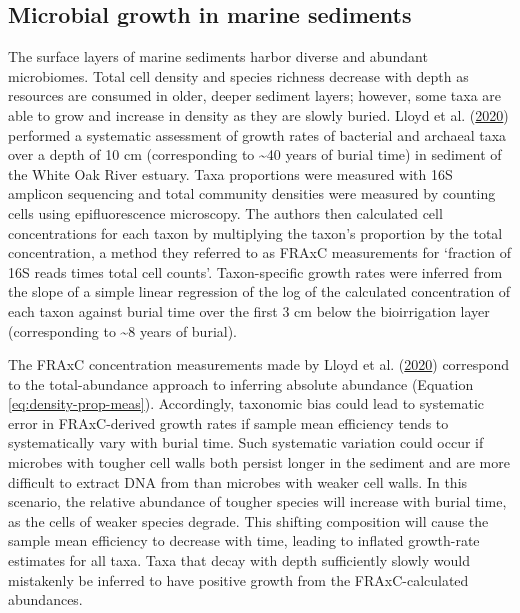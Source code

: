 \documentclass[
]{article}
\begin{document}
\hypertarget{microbial-growth-in-marine-sediments}{%
\subsection{Microbial growth in marine sediments}\label{microbial-growth-in-marine-sediments}}

The surface layers of marine sediments harbor diverse and abundant microbiomes.
Total cell density and species richness decrease with depth as resources are consumed in older, deeper sediment layers; however, some taxa are able to grow and increase in density as they are slowly buried.
Lloyd et al. (\protect\hyperlink{ref-lloyd2020evid}{2020}) performed a systematic assessment of growth rates of bacterial and archaeal taxa over a depth of 10 cm (corresponding to \textasciitilde40 years of burial time) in sediment of the White Oak River estuary.
Taxa proportions were measured with 16S amplicon sequencing and total community densities were measured by counting cells using epifluorescence microscopy.
The authors then calculated cell concentrations for each taxon by multiplying the taxon's proportion by the total concentration, a method they referred to as FRAxC measurements for `fraction of 16S reads times total cell counts'.
Taxon-specific growth rates were inferred from the slope of a simple linear regression of the log of the calculated concentration of each taxon against burial time over the first 3 cm below the bioirrigation layer (corresponding to \textasciitilde8 years of burial).

The FRAxC concentration measurements made by Lloyd et al. (\protect\hyperlink{ref-lloyd2020evid}{2020}) correspond to the total-abundance approach to inferring absolute abundance (Equation \eqref{eq:density-prop-meas}).
Accordingly, taxonomic bias could lead to systematic error in FRAxC-derived growth rates if sample mean efficiency tends to systematically vary with burial time.
Such systematic variation could occur if microbes with tougher cell walls both persist longer in the sediment and are more difficult to extract DNA from than microbes with weaker cell walls.
In this scenario, the relative abundance of tougher species will increase with burial time, as the cells of weaker species degrade.
This shifting composition will cause the sample mean efficiency to decrease with time, leading to inflated growth-rate estimates for all taxa.
Taxa that decay with depth sufficiently slowly would mistakenly be inferred to have positive growth from the FRAxC-calculated abundances.
\end{document}
